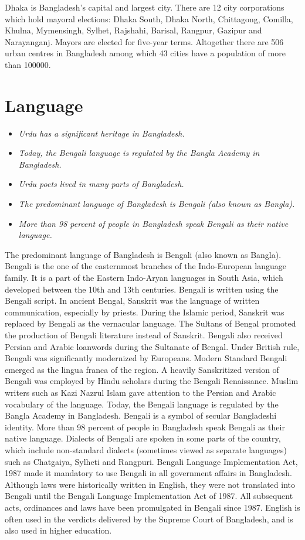 Dhaka is Bangladesh's capital and largest city. There are 12 city
corporations which hold mayoral elections: Dhaka South, Dhaka North,
Chittagong, Comilla, Khulna, Mymensingh, Sylhet, Rajshahi, Barisal,
Rangpur, Gazipur and Narayanganj. Mayors are elected for five-year
terms. Altogether there are 506 urban centres in Bangladesh among which
43 cities have a population of more than 100000.

\section{Language}\label{language}

\begin{itemize}
\item
  \emph{Urdu has a significant heritage in Bangladesh.}
\item
  \emph{Today, the Bengali language is regulated by the Bangla Academy
  in Bangladesh.}
\item
  \emph{Urdu poets lived in many parts of Bangladesh.}
\item
  \emph{The predominant language of Bangladesh is Bengali (also known as
  Bangla).}
\item
  \emph{More than 98 percent of people in Bangladesh speak Bengali as
  their native language.}
\end{itemize}

The predominant language of Bangladesh is Bengali (also known as
Bangla). Bengali is the one of the easternmost branches of the
Indo-European language family. It is a part of the Eastern Indo-Aryan
languages in South Asia, which developed between the 10th and 13th
centuries. Bengali is written using the Bengali script. In ancient
Bengal, Sanskrit was the language of written communication, especially
by priests. During the Islamic period, Sanskrit was replaced by Bengali
as the vernacular language. The Sultans of Bengal promoted the
production of Bengali literature instead of Sanskrit. Bengali also
received Persian and Arabic loanwords during the Sultanate of Bengal.
Under British rule, Bengali was significantly modernized by Europeans.
Modern Standard Bengali emerged as the lingua franca of the region. A
heavily Sanskritized version of Bengali was employed by Hindu scholars
during the Bengali Renaissance. Muslim writers such as Kazi Nazrul Islam
gave attention to the Persian and Arabic vocabulary of the language.
Today, the Bengali language is regulated by the Bangla Academy in
Bangladesh. Bengali is a symbol of secular Bangladeshi identity. More
than 98 percent of people in Bangladesh speak Bengali as their native
language. Dialects of Bengali are spoken in some parts of the country,
which include non-standard dialects (sometimes viewed as separate
languages) such as Chatgaiya, Sylheti and Rangpuri. Bengali Language
Implementation Act, 1987 made it mandatory to use Bengali in all
government affairs in Bangladesh. Although laws were historically
written in English, they were not translated into Bengali until the
Bengali Language Implementation Act of 1987. All subsequent acts,
ordinances and laws have been promulgated in Bengali since 1987. English
is often used in the verdicts delivered by the Supreme Court of
Bangladesh, and is also used in higher education.

